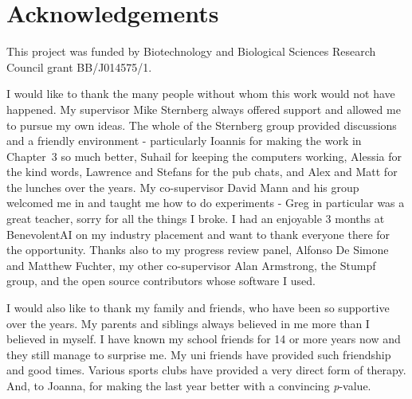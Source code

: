 \chapter*{Acknowledgements}

This project was funded by Biotechnology and Biological Sciences Research Council grant BB/J014575/1.

I would like to thank the many people without whom this work would not have happened.
My supervisor Mike Sternberg always offered support and allowed me to pursue my own ideas.
The whole of the Sternberg group provided discussions and a friendly environment - particularly Ioannis for making the work in Chapter~3 so much better, Suhail for keeping the computers working, Alessia for the kind words, Lawrence and Stefans for the pub chats, and Alex and Matt for the lunches over the years.
My co-supervisor David Mann and his group welcomed me in and taught me how to do experiments - Greg in particular was a great teacher, sorry for all the things I broke.
I had an enjoyable 3 months at BenevolentAI on my industry placement and want to thank everyone there for the opportunity.
Thanks also to my progress review panel, Alfonso De Simone and Matthew Fuchter, my other co-supervisor Alan Armstrong, the Stumpf group, and the open source contributors whose software I used.

I would also like to thank my family and friends, who have been so supportive over the years.
My parents and siblings always believed in me more than I believed in myself.
I have known my school friends for 14 or more years now and they still manage to surprise me.
My uni friends have provided such friendship and good times.
Various sports clubs have provided a very direct form of therapy.
And, to Joanna, for making the last year better with a convincing \textit{p}-value.
